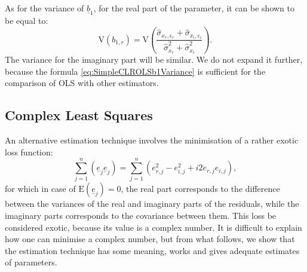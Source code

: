 \documentclass[
]{book}
\begin{document}
As for the variance of \(\underline{b}_1\), for the real part of the parameter, it can be shown to be equal to:
\begin{equation}
    \mathrm{V}(b_{1,r}) = \mathrm{V}\left(\frac{\hat{\sigma}_{x_r, \epsilon_r} + \hat{\sigma}_{x_i, \epsilon_i}}{\hat{\sigma}_{x_r}^2 + \hat{\sigma}_{x_i}^2}\right) .
    \label{eq:SimpleCLROLSb1Variance}
\end{equation}
The variance for the imaginary part will be similar. We do not expand it further, because the formula \eqref{eq:SimpleCLROLSb1Variance} is sufficient for the comparison of OLS with other estimators.

\hypertarget{SCLREstimationCLS}{%
\subsection{Complex Least Squares}\label{SCLREstimationCLS}}

An alternative estimation technique involves the minimisation of a rather exotic loss function:
\begin{equation}
    \sum_{j=1}^n (\underline{e}_j \underline{e}_j) = \sum_{j=1}^n (e_{r,j}^2 - e_{i,j}^2 + i 2 e_{r,j} e_{i,j}),
    \label{eq:SimpleCLRCLSLoss}
\end{equation}
for which in case of \(\mathrm{E}(\underline{e}_j)=0\), the real part corresponds to the difference between the variances of the real and imaginary parts of the residuals, while the imaginary parts corresponds to the covariance between them. This loss be considered exotic, because its value is a complex number. It is difficult to explain how one can minimise a complex number, but from what follows, we show that the estimation technique has some meaning, works and gives adequate estimates of parameters.
\end{document}

